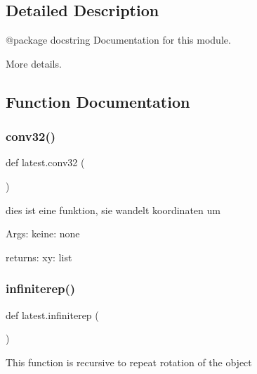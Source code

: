\subsection{Detailed Description}
\begin{DoxyVerb}@package docstring
Documentation for this module.

More details.
\end{DoxyVerb}
 

\subsection{Function Documentation}
\mbox{\label{namespacelatest_a320dbb56356349697f1911477c1df17a}} 
\subsubsection{\texorpdfstring{conv32()}{conv32()}}
{\footnotesize\ttfamily def latest.\+conv32 (\begin{DoxyParamCaption}{ }\end{DoxyParamCaption})}

\begin{DoxyVerb}dies ist eine funktion, sie wandelt koordinaten um

Args:
    keine: none

returns:
    xy: list    
\end{DoxyVerb}
 \mbox{\label{namespacelatest_aea99da204ea656f496ee4540245bc28b}} 
\subsubsection{\texorpdfstring{infiniterep()}{infiniterep()}}
{\footnotesize\ttfamily def latest.\+infiniterep (\begin{DoxyParamCaption}{ }\end{DoxyParamCaption})}

\begin{DoxyVerb}This function is recursive to repeat rotation of the object
\end{DoxyVerb}
 \mbox{\label{namespacelatest_a9b0b73ed3a6e0087dc5aca0cc80ecaee}} 
